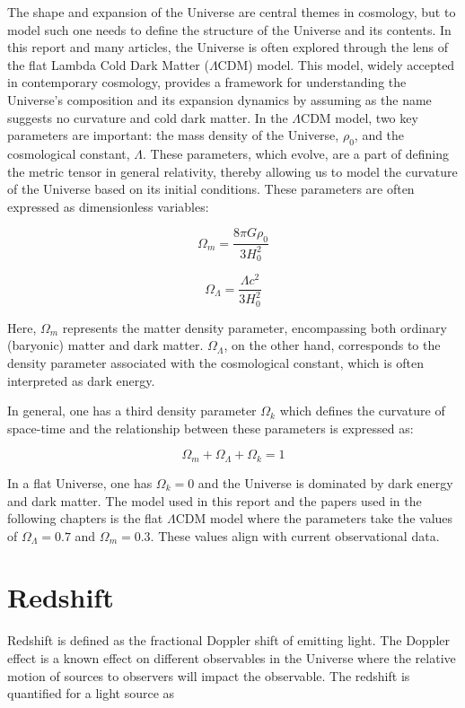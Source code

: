The shape and expansion of the Universe are central themes in cosmology, but to model such one needs to define the structure of the Universe and its contents. 
In this report and many articles, the Universe is
often explored through the lens of the flat Lambda Cold Dark Matter ($\Lambda$CDM) model. 
This model, widely accepted in contemporary cosmology, provides a framework for understanding the Universe's composition and its expansion dynamics by assuming as the name suggests no curvature and cold dark matter.
In the $\Lambda$CDM model, two key parameters are important: the mass density of the Universe, $\rho_0$, and the cosmological constant, $\Lambda$.
These parameters, which evolve, are a part of defining the metric tensor in general relativity, thereby allowing us to model the curvature of the Universe based on its initial conditions.
These parameters are often expressed as dimensionless variables:

$$
\Omega_m = \frac{8\pi G\rho_0}{3H_0^2}
$$

$$
\Omega_\Lambda = \frac{\Lambda c^2}{3H_0^2}
$$

Here, $\Omega_m$ represents the matter density parameter, encompassing both ordinary (baryonic) matter and dark matter. 
$\Omega_\Lambda$, on the other hand, corresponds to the density parameter associated with the cosmological constant, which is often interpreted as dark energy.




In general, one has a third density parameter $\Omega_k$ which defines the curvature of space-time and the relationship between these parameters is expressed as: 

$$
\Omega_m + \Omega_\Lambda + \Omega_k = 1
$$


In a flat Universe, one has $\Omega_k = 0$ and the Universe is dominated by dark energy and dark matter. The model used in this report and the papers used in the following chapters is the flat $\Lambda$CDM model where the parameters take the values of 
$\Omega_\Lambda = 0.7$ and $\Omega_m = 0.3$. These values align with current observational data.



\section{Redshift}
Redshift is defined as the fractional Doppler shift of emitting light. The Doppler effect is a known effect on different observables in the Universe where the relative motion of sources to observers will impact the observable. The redshift is quantified for a light source as 

